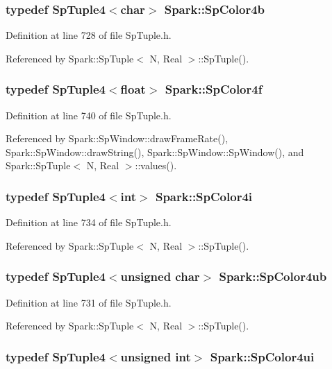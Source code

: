 \subsubsection{\setlength{\rightskip}{0pt plus 5cm}typedef Sp\-Tuple4$<$char$>$ {\bf Spark::Sp\-Color4b}}\label{namespaceSpark_a23}


Definition at line 728 of file Sp\-Tuple.h.

Referenced by Spark::Sp\-Tuple$<$ N, Real $>$::Sp\-Tuple().
\subsubsection{\setlength{\rightskip}{0pt plus 5cm}typedef Sp\-Tuple4$<$float$>$ {\bf Spark::Sp\-Color4f}}\label{namespaceSpark_a31}


Definition at line 740 of file Sp\-Tuple.h.

Referenced by Spark::Sp\-Window::draw\-Frame\-Rate(), Spark::Sp\-Window::draw\-String(), Spark::Sp\-Window::Sp\-Window(), and Spark::Sp\-Tuple$<$ N, Real $>$::values().
\subsubsection{\setlength{\rightskip}{0pt plus 5cm}typedef Sp\-Tuple4$<$int$>$ {\bf Spark::Sp\-Color4i}}\label{namespaceSpark_a27}


Definition at line 734 of file Sp\-Tuple.h.

Referenced by Spark::Sp\-Tuple$<$ N, Real $>$::Sp\-Tuple().
\subsubsection{\setlength{\rightskip}{0pt plus 5cm}typedef Sp\-Tuple4$<$unsigned char$>$ {\bf Spark::Sp\-Color4ub}}\label{namespaceSpark_a25}


Definition at line 731 of file Sp\-Tuple.h.

Referenced by Spark::Sp\-Tuple$<$ N, Real $>$::Sp\-Tuple().
\subsubsection{\setlength{\rightskip}{0pt plus 5cm}typedef Sp\-Tuple4$<$unsigned int$>$ {\bf Spark::Sp\-Color4ui}}\label{namespaceSpark_a29}


